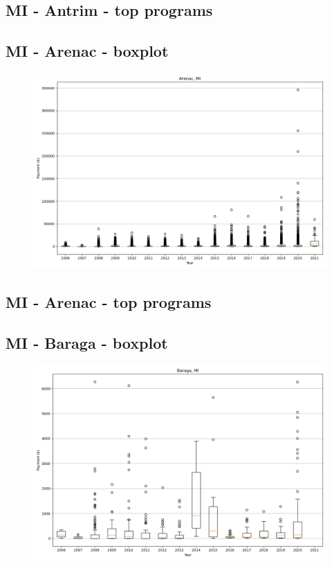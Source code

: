 \subsection*{MI - Antrim - top programs}

\newpage
\subsection*{MI - Arenac - boxplot}
\begin{figure}[h]
\centering
\includegraphics[width=7in]{../output/boxplots/counties/Arenac-MI_boxplot.png}
\end{figure}


\subsection*{MI - Arenac - top programs}

\newpage
\subsection*{MI - Baraga - boxplot}
\begin{figure}[h]
\centering
\includegraphics[width=7in]{../output/boxplots/counties/Baraga-MI_boxplot.png}
\end{figure}


